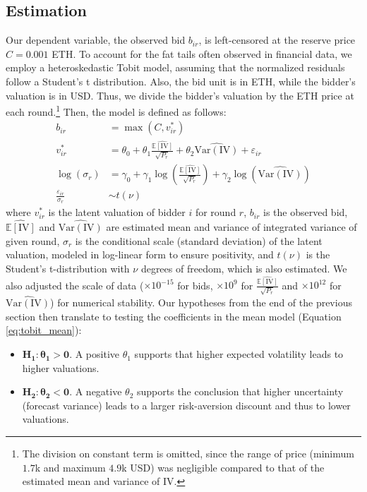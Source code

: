 \documentclass[runningheads]{llncs}
\newcommand{\E}{\mathbb{E}}
\newcommand{\Var}{\mathrm{Var}}
\newcommand{\IV}{\mathrm{IV}}
\begin{document}
\subsection{Estimation}
Our dependent variable, the observed bid $b_{ir}$, is left-censored at the reserve price $C = 0.001$ ETH. To account for the fat tails often observed in financial data, we employ a heteroskedastic Tobit model, assuming that the normalized residuals follow a Student's t distribution. Also, the bid unit is in ETH, while the bidder's valuation is in USD. Thus, we divide the bidder's valuation by the ETH price at each round.\footnote{The division on constant term is omitted, since the range of price (minimum $1.7$k and maximum $4.9$k USD) was negligible compared to that of the estimated mean and variance of \(\IV\).} Then, the model is defined as follows:
\begin{align}
    b_{ir} &= \max(C, v^*_{ir}) \label{eq:tobit_latent}\\
    v^*_{ir} &= \theta_0 + \theta_1 \frac{\widehat{\E[\IV]}}{\sqrt{P_r}} + \theta_2 \widehat{\Var(\IV)} + \varepsilon_{ir} \label{eq:tobit_mean}\\
    \log(\sigma_r) &= \gamma_0 + \gamma_1 \log\left(\frac{\widehat{\E[\IV]}}{\sqrt{P_r}}\right) + \gamma_2 
    \log\left( \widehat{\Var(\IV)} \right) \label{eq:tobit_scale} \\
    \frac{\varepsilon_{ir}}{\sigma_r} &\sim t(\nu)
\end{align}
where $v^*_{ir}$ is the latent valuation of bidder $i$ for round $r$, $b_{ir}$ is the observed bid, $\widehat{\E[\IV]}$ and $ \widehat{\Var(\IV)}$ are estimated mean and variance of integrated variance of given round, $\sigma_r$ is the conditional scale (standard deviation) of the latent valuation, modeled in log-linear form to ensure positivity, and $t(\nu)$ is the Student's t-distribution with $\nu$ degrees of freedom, which is also estimated. We also adjusted the scale of data ($\times 10^{-15}$ for bids, $\times 10^9$ for $\frac{\widehat{\E[\IV]}}{\sqrt{P_r}}$ and $\times 10^{12}$ for $\widehat{\Var(\IV)}$)  for numerical stability. Our hypotheses from the end of the previous section then translate to testing the coefficients in the mean model (Equation \ref{eq:tobit_mean}):
\begin{itemize}
    \item $\mathbf{H_1: \theta_1 > 0}$. A positive $\theta_1$ supports that higher expected volatility leads to higher valuations.
    \item $\mathbf{H_2: \theta_2 < 0}$. A negative $\theta_2$ supports the conclusion that higher uncertainty (forecast variance) leads to a larger risk-aversion discount and thus to lower valuations.
\end{itemize}
\end{document}

